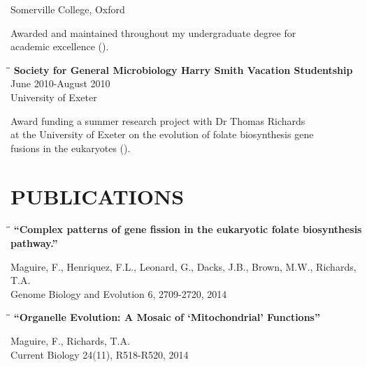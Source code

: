 \documentclass{res}
\begin{document}
\begin{resume}
\begin{tabbing}
                                               \> \> Somerville College, Oxford \\
   \end{tabbing}\vspace{-30pt}     
   Awarded and maintained throughout my undergraduate degree for \\academic excellence ().

\vspace{-0.1in}  
   \begin{tabbing}
   \hspace{2in}\= \hspace{2.6in}\= \kill 
    {\bf Society for General Microbiology Harry Smith Vacation Studentship} \> \>June 2010-August 2010\\
                            \> 
                            \> University of Exeter\\
   \end{tabbing}\vspace{-30pt}     
      Award funding a summer research project with Dr Thomas Richards \\
       at the University of Exeter on the evolution of folate biosynthesis gene \\
       fusions in the eukaryotes ().

\section{PUBLICATIONS} 
\vspace{-0.05in}
 \begin{tabbing}
   \hspace{2.3in}\= \hspace{2.6in}\= \kill
   {\bf ``Complex patterns of gene fission in the eukaryotic folate biosynthesis pathway.''\\
  }
   \end{tabbing}\vspace{-20pt}
   Maguire, F., Henriquez, F.L., Leonard, G., Dacks, J.B., Brown, M.W.,  Richards, T.A.\\
   Genome Biology and Evolution 6, 2709-2720, 2014\\

\vspace{-0.2in}
\begin{tabbing}
   \hspace{2.3in}\= \hspace{2.6in}\= \kill
   {\bf ``Organelle Evolution: A Mosaic of `Mitochondrial' Functions''} 
   \end{tabbing}\vspace{-20pt}
    Maguire, F., Richards, T.A.\\ 
    Current Biology 24(11), R518-R520, 2014\\


\end{resume}
\end{document}
